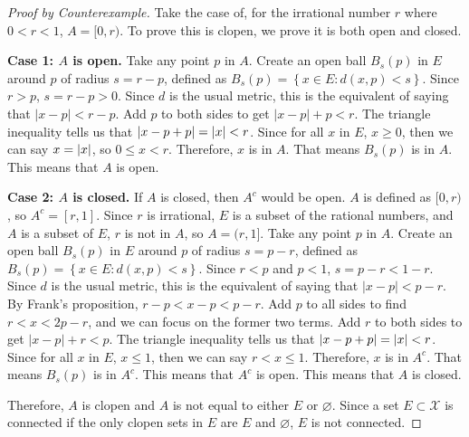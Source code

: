 \documentclass[11pt]{article}
\begin{document}
        \begin{proof}[Proof by Counterexample]
            Take the case of, for the irrational number $r$ where $0 < r < 1$, $A = [0,r)$.
            To prove this is clopen, we prove it is both open and closed.
            
            \textbf{Case 1: $A$ is open.}
                Take any point $p$ in $A$.
                Create an open ball $B_s(p)$ in $E$ around $p$ of radius $s = r - p$, defined as $B_s(p) = \left\{ x \in E : d(x,p) < s \right\}$.
                Since $r > p$, $s = r - p > 0$.
                Since $d$ is the usual metric, this is the equivalent of saying that $\left| x - p \right| < r - p$.
                Add $p$ to both sides to get $\left| x - p \right| + p < r$.
                The triangle inequality tells us that $\left| x - p + p \right| = \left| x \right| < r$.
                Since for all $x$ in $E$, $x \geq 0$, then we can say $x = \left| x \right|$, so $0 \leq x < r$.
                Therefore, $x$ is in $A$.
                That means $B_s(p)$ is in $A$.
                This means that $A$ is open.

            \textbf{Case 2: $A$ is closed.}
                If $A$ is closed, then $A^c$ would be open.
                $A$ is defined as $[0,r)$, so $A^c = [r,1]$.
                Since $r$ is irrational, $E$ is a subset of the rational numbers, and $A$ is a subset of $E$, $r$ is not in $A$, so $A = (r,1]$.
                Take any point $p$ in $A$.
                Create an open ball $B_s(p)$ in $E$ around $p$ of radius $s = p - r$, defined as $B_s(p) = \left\{ x \in E : d(x,p) < s \right\}$.
                Since $r < p$ and $p < 1$, $s = p - r < 1 - r$.
                Since $d$ is the usual metric, this is the equivalent of saying that $\left| x - p \right| < p - r$.
                By Frank's proposition, $r - p < x - p < p - r$.
                Add $p$ to all sides to find $r < x < 2p - r$, and we can focus on the former two terms.
                Add $r$ to both sides to get $\left| x - p \right| + r < p$.
                The triangle inequality tells us that $\left| x - p + p \right| = \left| x \right| < r$.
                Since for all $x$ in $E$, $x \leq 1$, then we can say $r < x \leq 1$.
                Therefore, $x$ is in $A^c$.
                That means $B_s(p)$ is in $A^c$.
                This means that $A^c$ is open.
                This means that $A$ is closed.

            Therefore, $A$ is clopen and $A$ is not equal to either $E$ or $\varnothing$.
            Since a set $E \subset \mathcal{X}$ is connected if the only clopen sets in $E$ are $E$ and $\varnothing$, $E$ is not connected.
        \end{proof}
\end{document}
